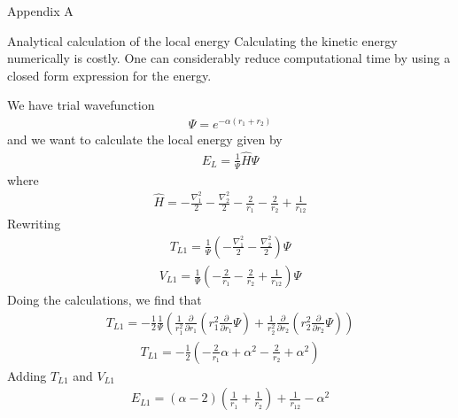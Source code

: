 \documentclass[a4paper, 12pt, titlepage]{article}
\begin{document}
\newpage

\appendix
\begin{section}{Appendix A}

\begin{subsection}{Analytical calculation of the local energy}
 Calculating the kinetic energy numerically is costly. One can considerably reduce computational time by using a closed form expression for the energy. 

 We have trial wavefunction 
 \begin{align*}
 	\Psi = e^{-\alpha(r_1 + r_2)}
 \end{align*}
 and we want to calculate the local energy given by
 \begin{align*}
 	E_L = \frac{1}{\Psi} \hat H \Psi
 \end{align*}
 where
 \begin{align*}
 	\hat H = -\frac{\nabla_1^2}{2} - \frac{\nabla_2^2}{2} - \frac{2}{r_1} - \frac{2}{r_2} + \frac{1}{r_{12}}
 \end{align*}
 Rewriting	
 \begin{align*}
 	T_{L1} = \frac{1}{\Psi} \left( -\frac{\nabla_1^2}{2} - \frac{\nabla_2^2}{2} \right) \Psi
 \end{align*}
 \begin{align*}
 	V_{L1} = \frac{1}{\Psi} \left( - \frac{2}{r_1} - \frac{2}{r_2} + \frac{1}{r_{12}} \right) \Psi
 \end{align*}
 Doing the calculations, we find that
 \begin{align*}
 	T_{L1} = -\frac{1}{2} \frac{1}{\Psi} \left( \frac{1}{r_1^2} \frac{\partial}{\partial r_1} \left( r_1^2 \frac{\partial}{\partial r_1} \Psi \right) + \frac{1}{r_2^2} \frac{\partial}{\partial r_2} \left( r_2^2 \frac{\partial}{\partial r_2} \Psi \right) \right)
 \end{align*}
 \begin{align*}
 	T_{L1} = -\frac{1}{2} \left( -\frac{2}{r_1}\alpha + \alpha^2 - \frac{2}{r_2} + \alpha^2 \right)
 \end{align*}
 Adding $T_{L1}$ and $V_{L1}$ 
 \begin{align*}
 	E_{L1} = \left( \alpha - 2 \right) \left( \frac{1}{r_1} + \frac{1}{r_2} \right) + \frac{1}{r_{12}} - \alpha^2 
 \end{align*}


\end{subsection}
\end{section}
\end{document}
